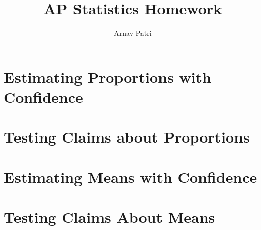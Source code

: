 \documentclass[12pt, A4]{report}
\title{AP Statistics Homework}
\author{Arnav Patri}
\begin{document}
	\maketitle
	\tableofcontents
	\setcounter{chapter}{7}
	\chapter{Estimating Proportions with Confidence}
		
	\chapter{Testing Claims about Proportions}
		
	\chapter{Estimating Means with Confidence}
		
	\chapter{Testing Claims About Means}
		
\end{document}
